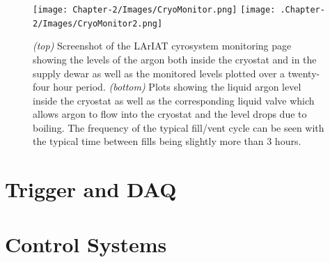 \begin{figure}[htb]
\centering
\texttt{[image: Chapter-2/Images/CryoMonitor.png]}
\texttt{[image: .Chapter-2/Images/CryoMonitor2.png]}
\caption{\emph{(top)} Screenshot of the LArIAT cyrosystem monitoring page showing the levels of the argon both inside the cryostat and in the supply dewar as well as the monitored levels plotted over a twenty-four hour period. \emph{(bottom)} Plots showing the liquid argon level inside the cryostat as well as the corresponding liquid valve which allows argon to flow into the cryostat and the level drops due to boiling. The frequency of the typical fill/vent cycle can be seen with the typical time between fills being slightly more than 3 hours.}
\label{fig:LArIATCryoMonitor}
\end{figure}



\section{Trigger and DAQ}
\section{Control Systems}
